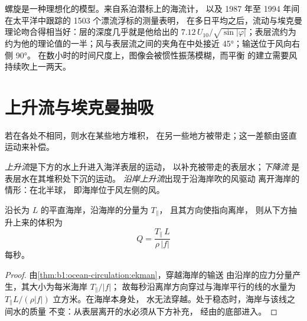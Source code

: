 螺旋是一种理想化的模型。来自系泊潜标上的海流计，
以及 1987 年至 1994 年间在太平洋中跟踪的 1503 个漂流浮标的测量表明，
在多日平均之后，流动与埃克曼理论吻合得相当好：层的深度几乎就是他给出的
$7.12\,U_{10}/\sqrt{\sin|\varphi|}$；表层流约为
约为他的理论值的一半；风与表层流之间的夹角在中处接近
\ang{45}；输送位于风向右侧 \ang{90}。
在数小时的时间尺度上，图像会被惯性振荡模糊，而平衡
的建立需要风持续吹上一两天。

\section{上升流与埃克曼抽吸}\label{sec:b1:ocean-circulation:upwelling}

若在各处不相同，则水在某些地方堆积，
在另一些地方被带走；这一差额由竖直运动来补偿。

\begin{definition}\label{def:b1:ocean-circulation:upwelling}
\emph{上升流}是下方的水上升进入海洋表层的运动，
以补充被带走的表层水；\emph{下降流}%
是表层水在其堆积处下沉的运动。
\emph{沿岸上升流}出现于沿海岸吹的风驱动
离开海岸的情形：在北半球，
即海岸位于风左侧的风。
\end{definition}

\begin{proposition}[沿岸上升流]\label{prop:b1:ocean-circulation:coastal}
沿长为 $L$ 的平直海岸，沿海岸的分量为 $T_\parallel$，
且其方向使指向离岸，
则从下方抽升上来的体积为
\[
  Q = \frac{T_\parallel\,L}{\rho\,|f|}
\]
每秒。
\end{proposition}

\begin{proof}
由\cref{thm:b1:ocean-circulation:ekman}，穿越海岸的输送
由沿岸的应力分量产生，其大小为每米海岸 $T_\parallel/|f|$；
故每秒沿离岸方向穿过与海岸平行的线的水量为 $T_\parallel L/(\rho|f|)$
立方米。在海岸本身处，
水无法穿越。处于稳态时，海岸与该线之间水的质量
不变：从表层离开的水必须从下方补充，
经由的底部进入。
\end{proof}

